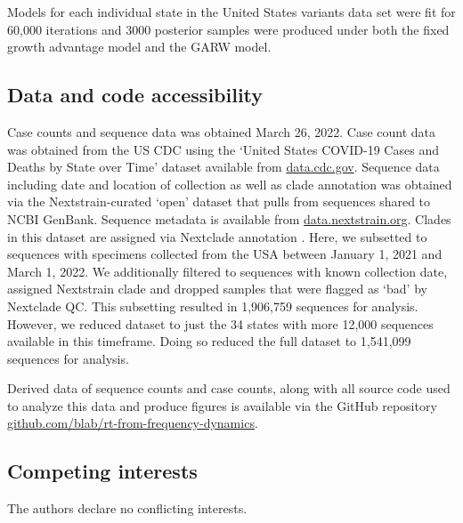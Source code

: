 \documentclass[11pt,oneside,letterpaper]{article}
\begin{document}
Models for each individual state in the United States variants data set were fit for 60,000 iterations and 3000 posterior samples were produced under both the fixed growth advantage model and the GARW model.

\subsection*{Data and code accessibility}

Case counts and sequence data was obtained March 26, 2022.
Case count data was obtained from the US CDC using the `United States COVID-19 Cases and Deaths by State over Time' dataset available from \href{https://data.cdc.gov/Case-Surveillance/United-States-COVID-19-Cases-and-Deaths-by-State-o/9mfq-cb36}{data.cdc.gov}.
Sequence data including date and location of collection as well as clade annotation was obtained via the Nextstrain-curated `open' dataset \cite{Hadfield2018} that pulls from sequences shared to NCBI GenBank.
Sequence metadata is available from \href{https://docs.nextstrain.org/projects/ncov/en/latest/reference/remote_inputs.html}{data.nextstrain.org}.
Clades in this dataset are assigned via Nextclade annotation \cite{aksamentov2021nextclade}.
Here, we subsetted to sequences with specimens collected from the USA between January 1, 2021 and March 1, 2022.
We additionally filtered to sequences with known collection date, assigned Nextstrain clade and dropped samples that were flagged as `bad' by Nextclade QC.
This subsetting resulted in 1,906,759 sequences for analysis.
However, we reduced dataset to just the 34 states with more 12,000 sequences available in this timeframe.
Doing so reduced the full dataset to 1,541,099 sequences for analysis.

Derived data of sequence counts and case counts, along with all source code used to analyze this data and produce figures is available via the GitHub repository \href{https://github.com/blab/rt-from-frequency-dynamics/}{github.com/blab/rt-from-frequency-dynamics}.

\subsection*{Competing interests}%

The authors declare no conflicting interests.

%
\end{document}
